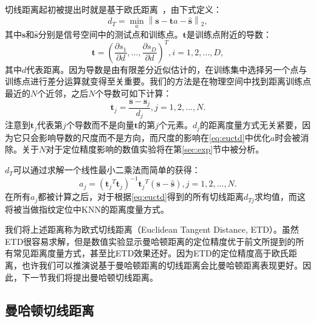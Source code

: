 切线距离起初被提出时就是基于欧氏距离~\cite{simard1998transformation}，由下式定义：
\begin{equation}
d_T = \mathop {\min }\limits_{a} {{\left\| \mathbf{s} - \mathbf{t}a - \widehat{\mathbf{s}} \right\|}_2}, \label{eq:euctd}
\end{equation}
其中$\mathbf{s}$和$\widehat{\mathbf{s}}$分别是信号空间中的测试点和训练点。$\mathbf{t}$是训练点附近的导数：
\begin{equation}
\mathbf{t} = {\left( \frac{\partial s_1}{\partial d}, ..., \frac{\partial s_D}{\partial d} \right)}^T, i = 1, 2, ..., D,
\end{equation}
其中$d$代表距离。因为导数是由有限差分近似估计的，在训练集中选择另一个点与训练点进行差分运算就变得至关重要。我们的方法是在物理空间中找到距离训练点最近的$N$个近邻，之后$N$个导数可如下计算：
\begin{equation}
\mathbf{t}_j = \frac{\mathbf{s} - \mathbf{s}_j}{d_j}, j = 1, 2, ..., N.
\end{equation}
注意到$\mathbf{t}_j$代表第$j$个导数而不是向量$\mathbf{t}$的第$j$个元素。$d_j$的距离度量方式无关紧要，因为它只会影响导数的尺度而不是方向，而尺度的影响在\eqref{eq:euctd}中优化$a$时会被消除。关于$N$对于定位精度影响的数值实验将在第\ref{sec:exp}节中被分析。

$d_T$可以通过求解一个线性最小二乘法而简单的获得：
\begin{equation}
a_j = {\left( {\mathbf{t}_j}^T\mathbf{t}_j \right)}^{-1}{\mathbf{t}_j}^T\left( {\mathbf{s}} - \widehat{\mathbf{s}} \right), j = 1, 2, ..., N. \label{eq:euca}
\end{equation}
在所有$a_j$都被计算之后，对于根据\eqref{eq:euctd}得到的所有切线距离$d_{Tj}$求均值，而这将被当做指纹定位中KNN的距离度量方式。

我们将上述距离称为欧式切线距离（Euclidean Tangent Distance, ETD）。虽然ETD很容易求解，但是数值实验显示曼哈顿距离的定位精度优于前文所提到的所有常见距离度量方式，甚至比ETD效果还好。因为ETD的定位精度高于欧氏距离，也许我们可以推演说基于曼哈顿距离的切线距离会比曼哈顿距离表现更好。因此，下一节我们将提出曼哈顿切线距离。

\subsection{曼哈顿切线距离}

